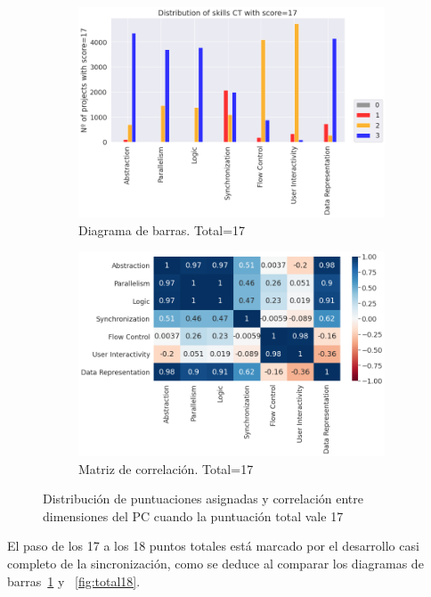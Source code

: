 \documentclass[a4paper, 12pt]{book}
\begin{document}
\begin{figure}[H]
    \centering
    \begin{subfigure}[h]{.49\textwidth} 
        \includegraphics[width=\textwidth]{img/distribucion_17_Scratch}
        \caption{Diagrama de barras. Total=17}
        \label{fig:total17}
    \end{subfigure}       
    \begin{subfigure}[h]{.49\textwidth} 
        \includegraphics[width=\textwidth]{img/corr_17_Scratch}
        \caption{Matriz de correlación. Total=17}
        \label{fig:corr17}
    \end{subfigure}
     \caption{Distribución de puntuaciones asignadas y correlación entre dimensiones del PC cuando la puntuación total vale 17}
\end{figure}

El paso de los 17 a los 18 puntos totales está marcado por el desarrollo casi completo de la sincronización, como se deduce al comparar los diagramas de barras~\ref{fig:total17} y ~\ref{fig:total18}.
\end{document}
